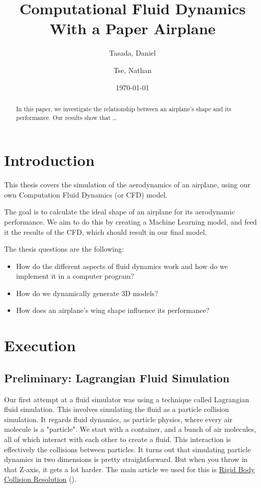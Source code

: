 \documentclass[a4paper,12pt]{article}
\title{Computational Fluid Dynamics With a Paper Airplane}
\author{
  Tasada, Daniel\\
  \and
  Tse, Nathan\\
}
\date{\today}
\begin{document}
\maketitle
\begin{abstract}
	In this paper, we investigate the relationship between an airplane's shape and its performance.
	Our results show that \dots
\end{abstract}

\tableofcontents

\section{Introduction}
This thesis covers the simulation of the aerodynamics of an airplane, using
our own Computation Fluid Dynamics (or CFD) model.

The goal is to calculate the ideal shape of an airplane for its aerodynamic performance.
We aim to do this by creating a Machine Learning model, and feed it the results of the CFD,
which should result in our final model.

The thesis questions are the following:
\begin{itemize}
	\item{How do the different aspects of fluid dynamics work and how do we implement it in a computer program?}
	\item{How do we dynamically generate 3D models?}
	\item{How does an airplane's wing shape influence its performance?}
\end{itemize}

\section{Execution}
\subsection{Preliminary: Lagrangian Fluid Simulation}
Our first attempt at a fluid simulator was using a technique called Lagrangian fluid simulation.
This involves simulating the fluid as a particle collision simulation.
It regards fluid dynamics, as particle physics, where every air molecule is a "particle".
We start with a container, and a bunch of air molecules, all of which interact with
each other to create a fluid. This interaction is effectively the collisions between particles.
It turns out that simulating  particle dynamics in two dimensions is pretty straightforward.
But when you throw in that Z-axis, it gets a lot harder.
The main article we used for this is \hyperlink{http://www.hakenberg.de/diffgeo/collision_resolution.htm}{Rigid Body Collision Resolution} (\cite{hakenberg}).
\end{document}
